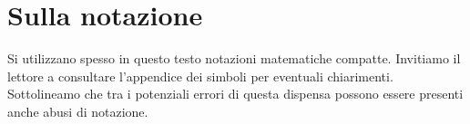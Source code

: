 \section*{Sulla notazione}
Si utilizzano spesso in questo testo notazioni matematiche compatte.
Invitiamo il lettore a consultare l'appendice dei simboli per eventuali
chiarimenti. Sottolineamo che tra i potenziali errori di questa dispensa
possono essere presenti anche abusi di notazione.

